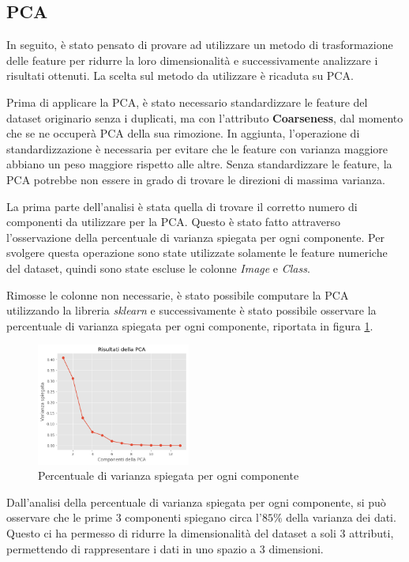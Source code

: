\subsection{PCA} \label{sec:pca}
In seguito, è stato pensato di provare ad utilizzare un metodo di trasformazione 
delle feature per ridurre la loro dimensionalità e successivamente analizzare i 
risultati ottenuti. La scelta sul metodo da utilizzare è ricaduta su PCA.

Prima di applicare la PCA, è stato necessario standardizzare le feature del dataset
originario senza i duplicati, ma con l'attributo \textbf{Coarseness}, dal momento
che se ne occuperà PCA della sua rimozione. In aggiunta, l'operazione di standardizzazione
è necessaria per evitare che le feature con varianza maggiore abbiano
un peso maggiore rispetto alle altre. Senza standardizzare le feature, la PCA
potrebbe non essere in grado di trovare le direzioni di massima varianza.

La prima parte dell'analisi è stata quella di trovare il corretto numero di
componenti da utilizzare per la PCA. Questo è stato fatto attraverso
l'osservazione della percentuale di varianza spiegata per ogni componente. Per
svolgere questa operazione sono state utilizzate solamente le feature numeriche
del dataset, quindi sono state escluse le colonne \textit{Image} e \textit{Class}.

Rimosse le colonne non necessarie, è stato possibile computare la PCA utilizzando
la libreria \textit{sklearn} e successivamente è stato possibile osservare la
percentuale di varianza spiegata per ogni componente, riportata in figura \ref{fig:pca}.

\begin{figure}[!ht]
      \centering
      \includegraphics[width=0.45\textwidth]{img/analisi/pcaVarianza.png}
      \caption{Percentuale di varianza spiegata per ogni componente}
      \label{fig:pca}
\end{figure}

Dall'analisi della percentuale di varianza spiegata per ogni componente, si può
osservare che le prime $3$ componenti spiegano circa l'$85\%$ della varianza
dei dati. Questo ci ha permesso di ridurre la dimensionalità del dataset a soli
$3$ attributi, permettendo di rappresentare i dati in uno spazio a $3$ dimensioni.

